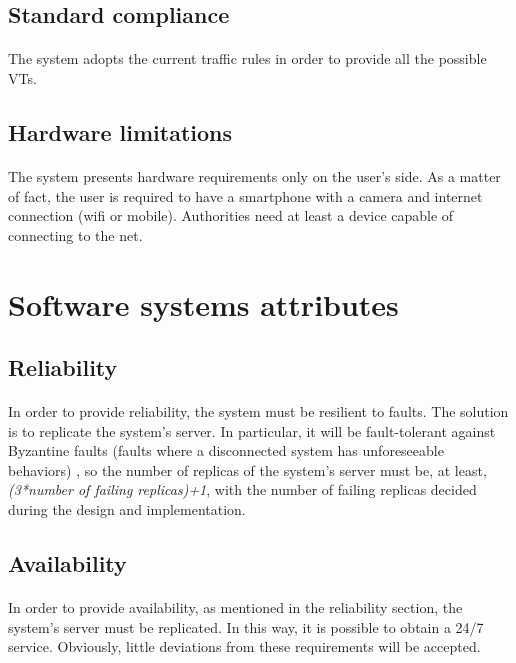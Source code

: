 			\subsection{Standard compliance}
				\paragraph{}
					The system adopts the current traffic rules in order to provide all the possible VTs.
			\subsection{Hardware limitations}
				\paragraph{}
					The system presents hardware requirements only on the user's side. As a matter of fact, the user is required to have a smartphone with a camera and internet connection (wifi or mobile). Authorities need at least a device capable of connecting to the net.
		\section{Software systems attributes}
			\subsection{Reliability}
				\paragraph{}
					In order to provide reliability, the system must be resilient to faults. The solution is to replicate the system's server. In particular, it will be fault-tolerant against Byzantine faults (faults where a disconnected system has unforeseeable
behaviors) , so the number of replicas of the system's server must be, at least, \textit{(3*number of failing replicas)+1}, with the number of failing replicas decided during the design and implementation.
			\subsection{Availability}
				\paragraph{}
					In order to provide availability, as mentioned in the reliability section, the system's server must be replicated. In this way, it is possible to obtain a 24/7 service. Obviously, little deviations from these requirements will be accepted.
